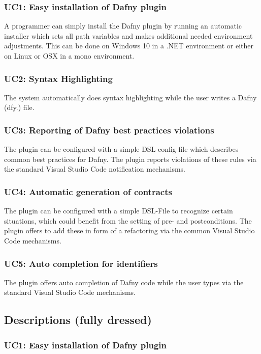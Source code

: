 \subsubsection{UC1: Easy installation of Dafny plugin}
A programmer can simply install the Dafny plugin by running an automatic installer which sets all path variables and makes additional needed environment adjustments. This can be done on Windows 10 in a .NET environment or either on Linux or OSX in a mono environment.
\subsubsection{UC2: Syntax Highlighting}
The system automatically does syntax highlighting while the user writes a Dafny (dfy.) file.
\subsubsection{UC3: Reporting of Dafny best practices violations}
The plugin can be configured with a simple DSL config file which describes common best practices for Dafny. The plugin reports violations of these rules via the standard Visual Studio Code notification mechanisms.
\subsubsection{UC4: Automatic generation of contracts}
The plugin can be configured with a simple DSL-File to recognize certain situations, which could benefit from the setting of pre- and postconditions. The plugin offers to add these in form of a refactoring via the common Visual Studio Code mechanisms.

\subsubsection{UC5: Auto completion for identifiers}
The plugin offers auto completion of Dafny code while the user types via the standard Visual Studio Code mechanisms.
\subsection{Descriptions (fully dressed)}

\subsubsection{UC1: Easy installation of Dafny plugin}

